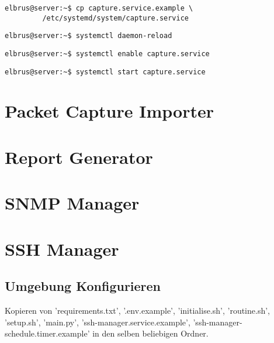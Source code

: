 \documentclass{article}
\begin{document}
	\lstset{style=commands}
	\begin{lstlisting}[caption={Kopieren des Serviceprogrammes}]
		elbrus@server:~$ cp capture.service.example \
		 /etc/systemd/system/capture.service
	\end{lstlisting}

	\begin{lstlisting}[caption={Neuladen des 'systemctl' Deamons}]
		elbrus@server:~$ systemctl daemon-reload
	\end{lstlisting}
	
	\begin{lstlisting}[caption={Aktivieren des Serviceprogrammes}]
		elbrus@server:~$ systemctl enable capture.service
	\end{lstlisting}

	\begin{lstlisting}[caption={Starten des Serviceprogrammes}]
		elbrus@server:~$ systemctl start capture.service
	\end{lstlisting}
	
	\newpage
	
	
	\section{Packet Capture Importer}
	\newpage
	
	\section{Report Generator}
	\newpage
	
	\section{SNMP Manager}
	\newpage
	
	\section{SSH Manager}
	\subsection[file config]{Umgebung Konfigurieren}
	
	Kopieren von 'requirements.txt', '.env.example', 'initialise.sh', 'routine.sh', 'setup.sh', 'main.py', 'ssh-manager.service.example', 'ssh-manager-schedule.timer.example' in den selben beliebigen Ordner. 
	
\end{document}
